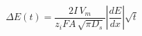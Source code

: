 \documentclass[preview]{standalone}
\begin{document}
\[\Delta E(t) = \frac{2I\,V_m}{z_i F A\,\sqrt{\pi D_s}}\left|\frac{dE}{dx}\right|\sqrt{t} \tag{3.16}\]
\end{document}
